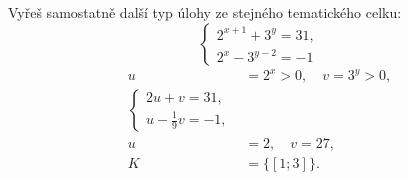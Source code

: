 \documentclass[11pt,a4paper]{article}
\begin{document}
\begin{zadaniReseniBox}[title={Samostatná práce 2}]
Vyřeš samostatně další typ úlohy ze stejného tematického celku:
\[
\displaystyle\begin{cases}2^{x+1}+3^y=31,\\2^x-3^{y-2}=-1\end{cases}
\]
\tcblower
\[\begin{aligned}u&=2^x>0,\quad v=3^y>0,\\\begin{cases}2u+v=31,\\u-\frac{1}{9}v=-1,\end{cases}\\u&=2,\quad v=27,\\K&=\{[1;3]\}.\end{aligned}\]
\end{zadaniReseniBox}
\end{document}
